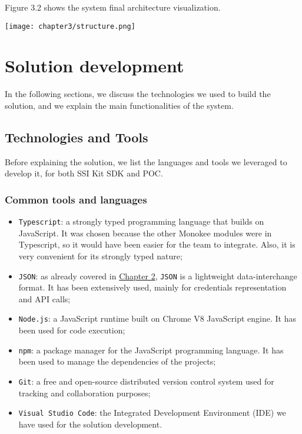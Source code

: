 Figure 3.2 shows the system final architecture visualization.
\begin{center}
    \texttt{[image: chapter3/structure.png]}
    \label{fig:structure}
\end{center}

\clearpage
\section{Solution development}
In the following sections, we discuss the technologies we used to build the
solution, and we explain the main functionalities of the system.
\subsection{Technologies and Tools}
Before explaining the solution, we list the languages and tools we leveraged to develop it,
for both SSI Kit SDK and POC.

\subsubsection{Common tools and languages}
\begin{itemize}
    \setlength\itemsep{-0.1em}
    \item \texttt{Typescript}: a strongly typed programming language that builds 
    on JavaScript. It was chosen because the other Monokee modules were in 
    Typescript, so it would have been easier for the team to integrate. Also, it is 
    very convenient for its strongly typed nature;
    \item \texttt{JSON}: as already covered in \hyperref[subsubsec:json]{Chapter 2}, 
    \texttt{JSON} is a lightweight data-interchange format. It has been extensively used,
    mainly for credentials representation and API calls;
    \item \texttt{Node.js}: a JavaScript runtime built on Chrome V8 JavaScript
    engine. It has been used for code execution;
    \item \texttt{npm}: a package manager for the JavaScript programming language.
    It has been used to manage the dependencies of the projects;
    \item \texttt{Git}: a free and open-source distributed version control system
    used for tracking and collaboration purposes;
    \item \texttt{Visual Studio Code}: the Integrated Development Environment (IDE)
    we have used for the solution development.
\end{itemize}

